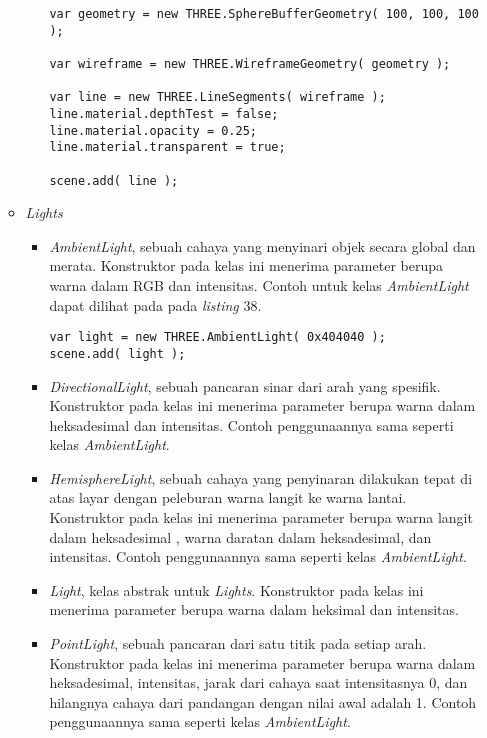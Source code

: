 \documentclass[a4paper,twoside]{article}
\begin{document}
\begin{enumerate}
\begin{itemize}
\begin{itemize}
\begin{lstlisting}[caption={Contoh penggunaan kelas {\it WireframeGeometry}.},captionpos=b]
var geometry = new THREE.SphereBufferGeometry( 100, 100, 100 );

var wireframe = new THREE.WireframeGeometry( geometry );

var line = new THREE.LineSegments( wireframe );
line.material.depthTest = false;
line.material.opacity = 0.25;
line.material.transparent = true;

scene.add( line );
\end{lstlisting}

	\end{itemize}
	
\item \textit{Lights}

	\begin{itemize}
	\item {\it AmbientLight}, sebuah cahaya yang menyinari objek secara global dan merata. Konstruktor pada kelas ini menerima parameter berupa warna dalam RGB dan intensitas. Contoh untuk kelas {\it AmbientLight} dapat dilihat pada pada {\it listing} 38.
	
\begin{lstlisting}[caption={Contoh penggunaan kelas {\it AmbientLight}.},captionpos=b]
var light = new THREE.AmbientLight( 0x404040 ); 
scene.add( light );
\end{lstlisting}
	
	\item {\it DirectionalLight}, sebuah pancaran sinar dari arah yang spesifik. Konstruktor pada kelas ini menerima parameter berupa warna dalam heksadesimal dan intensitas. Contoh penggunaannya sama seperti kelas {\it AmbientLight}.

	\item {\it HemisphereLight}, sebuah cahaya yang penyinaran dilakukan tepat di atas layar dengan peleburan warna langit ke warna lantai. Konstruktor pada kelas ini menerima parameter berupa warna langit dalam heksadesimal , warna daratan dalam heksadesimal, dan intensitas. Contoh penggunaannya sama seperti kelas {\it AmbientLight}.
	
	\item {\it Light}, kelas abstrak untuk {\it Lights}. Konstruktor pada kelas ini menerima parameter berupa warna dalam heksimal dan intensitas.

	\item {\it PointLight}, sebuah pancaran dari satu titik pada setiap arah. Konstruktor pada kelas ini menerima parameter berupa warna dalam heksadesimal, intensitas, jarak dari cahaya saat intensitasnya 0, dan hilangnya cahaya dari pandangan dengan nilai awal adalah 1. Contoh penggunaannya sama seperti kelas {\it AmbientLight}.
	

\end{itemize}
\end{itemize}
\end{enumerate}
\end{document}
